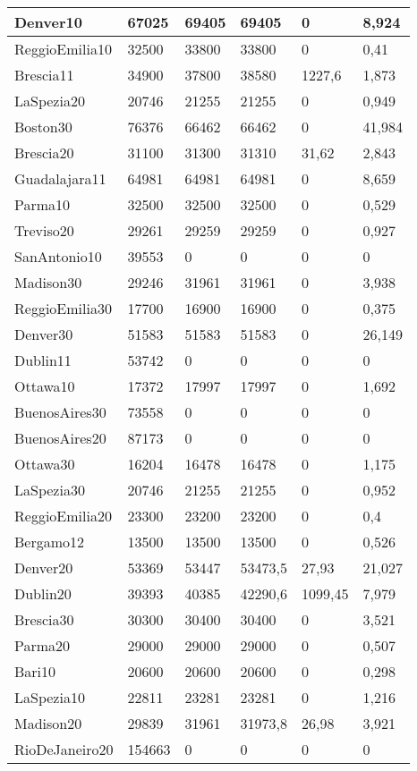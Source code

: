 \begin{longtable}[c]{|l|l|l|l|l|l|}
Denver10 & 67025 & 69405 & 69405 & 0 & 8,924 \\ \hline
ReggioEmilia10 & 32500 & 33800 & 33800 & 0 & 0,41 \\ \hline
Brescia11 & 34900 & 37800 & 38580 & 1227,6 & 1,873 \\ \hline
LaSpezia20 & 20746 & 21255 & 21255 & 0 & 0,949 \\ \hline
Boston30 & 76376 & 66462 & 66462 & 0 & 41,984 \\ \hline
Brescia20 & 31100 & 31300 & 31310 & 31,62 & 2,843 \\ \hline
Guadalajara11 & 64981 & 64981 & 64981 & 0 & 8,659 \\ \hline
Parma10 & 32500 & 32500 & 32500 & 0 & 0,529 \\ \hline
Treviso20 & 29261 & 29259 & 29259 & 0 & 0,927 \\ \hline
SanAntonio10 & 39553 & 0 & 0 & 0 & 0 \\ \hline
Madison30 & 29246 & 31961 & 31961 & 0 & 3,938 \\ \hline
ReggioEmilia30 & 17700 & 16900 & 16900 & 0 & 0,375 \\ \hline
Denver30 & 51583 & 51583 & 51583 & 0 & 26,149 \\ \hline
Dublin11 & 53742 & 0 & 0 & 0 & 0 \\ \hline
Ottawa10 & 17372 & 17997 & 17997 & 0 & 1,692 \\ \hline
BuenosAires30 & 73558 & 0 & 0 & 0 & 0 \\ \hline
BuenosAires20 & 87173 & 0 & 0 & 0 & 0 \\ \hline
Ottawa30 & 16204 & 16478 & 16478 & 0 & 1,175 \\ \hline
LaSpezia30 & 20746 & 21255 & 21255 & 0 & 0,952 \\ \hline
ReggioEmilia20 & 23300 & 23200 & 23200 & 0 & 0,4 \\ \hline
Bergamo12 & 13500 & 13500 & 13500 & 0 & 0,526 \\ \hline
Denver20 & 53369 & 53447 & 53473,5 & 27,93 & 21,027 \\ \hline
Dublin20 & 39393 & 40385 & 42290,6 & 1099,45 & 7,979 \\ \hline
Brescia30 & 30300 & 30400 & 30400 & 0 & 3,521 \\ \hline
Parma20 & 29000 & 29000 & 29000 & 0 & 0,507 \\ \hline
Bari10 & 20600 & 20600 & 20600 & 0 & 0,298 \\ \hline
LaSpezia10 & 22811 & 23281 & 23281 & 0 & 1,216 \\ \hline
Madison20 & 29839 & 31961 & 31973,8 & 26,98 & 3,921 \\ \hline
RioDeJaneiro20 & 154663 & 0 & 0 & 0 & 0 \\ \hline
\end{longtable}


